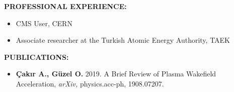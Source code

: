 \textbf{PROFESSIONAL EXPERIENCE:}   
\vspace{-3mm}
\begin{itemize}[leftmargin=0.7cm,itemsep=-0.25em,labelsep=5mm] %
	\item CMS User, CERN
	\item Associate researcher at the Turkish Atomic Energy Authority, TAEK
\end{itemize}

\textbf{PUBLICATIONS:} 
\vspace{-3mm}
\begin{itemize}[leftmargin=0.7cm,itemsep=0.5em,labelsep=5mm] %
	
	\item \textbf{Çakır A., Güzel O.} 2019. A Brief Review of Plasma Wakefield Acceleration, 
	\textit{arXiv,}
	physics.acc-ph, 1908.07207.

\end{itemize}



\newpage %
\thispagestyle{empty} %
\def\sirtyili{2022} %
\def\studentname{A. O. GÜZEL} %
\def\thesisthickness{25mm} %

